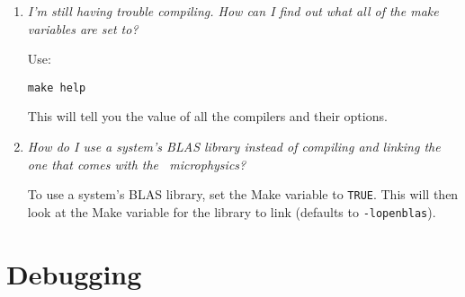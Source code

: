 \begin{enumerate}
\item {\em I'm still having trouble compiling.  How can I find out what
  all of the make variables are set to?}

  Use:
\begin{verbatim}
make help
\end{verbatim}
  This will tell you the value of all the compilers and their options.


\item {\em How do I use a system's BLAS library instead of compiling and
  linking the one that comes with the \starkiller\ microphysics?}

  To use a system's BLAS library, set the Make variable
   to {\tt TRUE}.  This will then look at
  the Make variable  for the library to link
  (defaults to {\tt -lopenblas}).




\end{enumerate}

\section{Debugging}

